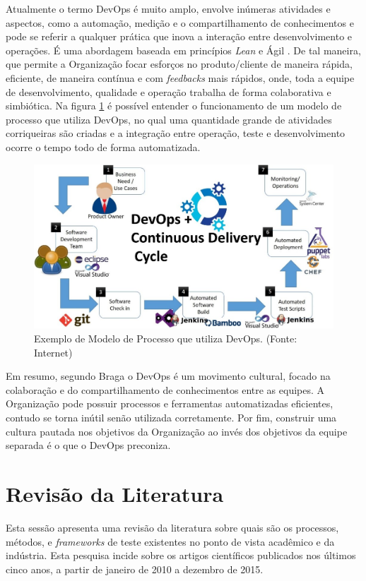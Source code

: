 Atualmente o termo DevOps é muito amplo, envolve inúmeras atividades e aspectos, como a automação, medição e o compartilhamento de conhecimentos \cite{huttermann2012} e pode se referir a qualquer prática que inova a interação entre desenvolvimento e operações. É uma abordagem baseada em princípios \textit{Lean} e Ágil \cite{BRAGA2015}. De tal maneira, que permite a Organização focar esforços no produto/cliente de maneira rápida, eficiente, de maneira contínua e com \textit{feedbacks} mais rápidos, onde, toda a equipe de desenvolvimento, qualidade e operação trabalha de forma colaborativa e simbiótica. Na figura \ref{fig:figure24} é possível entender o funcionamento de um modelo de processo que utiliza DevOps, no qual uma quantidade grande de atividades corriqueiras são criadas e a integração entre operação, teste e desenvolvimento ocorre o tempo todo de forma automatizada.

\begin{figure}[H]
\centering
\includegraphics[width=.75\textwidth]{fig/figura24.png}
\caption{Exemplo de Modelo de Processo que utiliza DevOps. (Fonte: Internet)}
\label{fig:figure24}
\end{figure}

Em resumo, segundo Braga \cite{BRAGA2015} o DevOps é um movimento cultural, focado na colaboração e do compartilhamento de conhecimentos entre as equipes. A Organização pode possuir processos e ferramentas automatizadas eficientes, contudo se torna inútil senão utilizada corretamente. 
Por fim, construir uma cultura pautada nos objetivos da Organização ao invés dos objetivos da equipe separada é o que o DevOps preconiza.

\section{Revisão da Literatura}
\label{sec:revisaoliteraturacap2}

Esta sessão apresenta uma revisão da literatura sobre quais são os processos, métodos, e \textit{frameworks} de teste existentes no ponto de vista acadêmico e da indústria. Esta pesquisa incide sobre os artigos científicos publicados nos últimos cinco anos, a partir de janeiro de 2010 a dezembro de 2015.

